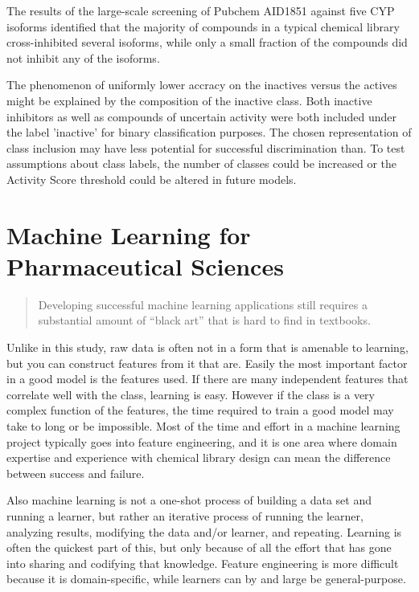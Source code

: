 The results of the large-scale screening of Pubchem AID1851 against five CYP isoforms identified that the majority of compounds in a typical chemical library cross-inhibited several isoforms, while only a small fraction of the compounds did not inhibit any of the isoforms. \cite{Veith2009}

The phenomenon of uniformly lower accracy on the inactives versus the actives might be explained by the composition of the inactive class. Both inactive inhibitors as well as compounds of uncertain activity were both included under the label 'inactive' for binary classification purposes. The chosen representation of class inclusion may have less potential for successful discrimination than. To test assumptions about class labels, the number of classes could be increased or the Activity Score threshold could be altered in future models.


\section{Machine Learning for Pharmaceutical Sciences}
\begin{quote}
Developing successful machine learning applications still requires a substantial amount of “black art” that is hard to find in textbooks. \cite{Domingos2012}
\end{quote}

Unlike in this study, raw data is often not in a form that is amenable to learning, but you can construct features from it that are. Easily the most important factor in a good model is the features used. If there are many independent features that correlate well with the class, learning is easy. However if the class is a very complex function of the features, the time required to train a good model may take to long or be impossible. \cite{Domingos2012} Most of the time and effort in a machine learning project typically goes into feature engineering, and it is one area where domain expertise and experience with chemical library design can mean the difference between success and failure.

Also machine learning is not a one-shot process of building a data set and running a learner, but rather an iterative process of running the learner, analyzing results, modifying the data and/or learner, and repeating. Learning is often the quickest part of this, but only because of all the  effort that has gone into sharing and codifying that knowledge. Feature engineering is more difficult because it is domain-specific, while learners can by and large be general-purpose. \cite{Domingos2012}

